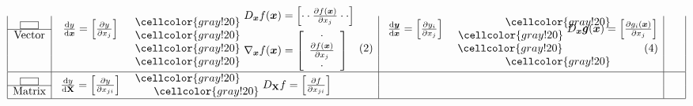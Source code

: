 \documentclass[12pt,thmsa]{article}
\begin{document}
\[\begin{aligned}
\begin{array}{|c|cl|cc|cc|}
		\fbox{\vspace{1em}\hspace{1em}} 
			& \multirow{2}{*}{ \(\frac{\mathrm{d} y}{\mathrm{d} \boldsymbol{x}}=\left[\frac{\partial y}{\partial x_j}\right]\) }
			& \cellcolor{gray!20}\multirow{-2}{*}{ 
				\(D_{\boldsymbol{x}} f(\boldsymbol{x}) =\left[ \cdot \cdot \frac{\partial f(\boldsymbol{x})}{\partial x_j} \cdot \cdot \right] \)}
			& \multirow{2}{*}{ \( \frac{\mathrm{d} \boldsymbol{y}}{\mathrm{d} \boldsymbol{x}}=\left[\frac{\partial y_i}{\partial x_j}\right]\) }
			&  \cellcolor{gray!20} 
			& 
			& \\  %
		\cline{1-1}
		\text{Vector} 
			& 
			& \cellcolor{gray!20} 
			& 
			& \cellcolor{gray!20}\multirow{-2}{*}{ \( D_{\boldsymbol{x}} \boldsymbol{g}(\boldsymbol{x}) =\left[\frac{\partial g_i(\boldsymbol{x})}{\partial x_j}\right] \)} 
			& 
			&  \\  %
		{}
			&
			& \cellcolor{gray!20} \hspace{3.8cm} (2)
			& 
			& \cellcolor{gray!20} \hspace{2.6cm} (4) 
			& 
			& \\  %
		{}
			& 
			&\cellcolor{gray!20} \multirow{-3}{*}{ \(\nabla_{\boldsymbol{x}} f(\boldsymbol{x}) =\left[\begin{array}{c} 
					\cdot \\ \frac{\partial f(\boldsymbol{x})}{\partial x_j} \\ \cdot  \end{array}
				\right]\) }
			&
			& \cellcolor{gray!20}  
			& 
			& \\ [0.1cm] %
		\hline
		\fbox{\vspace{1em}\hspace{1em}}
			& \multirow{2}{*}{ \( \frac{\mathrm{d} y}{\mathrm{d} \mathbf{X}}=\left[\frac{\partial y}{\partial x_{j i}}\right] \) }
			& \cellcolor{gray!20} 
			& 
			& 
			& 
			& \\  %
		\cline{1-1} \text{Matrix} 
			& 
			& \hspace{0.6cm} \cellcolor{gray!20}\multirow{-2}{*}{ \( D_{\mathbf{X}} f=\left[\frac{\partial f}{\partial x_{j i}}\right] \) } 
			& 
			& 
			& 
			&\\  %
		\hline
	\end{array}
\end{aligned}
\]
\end{document}
